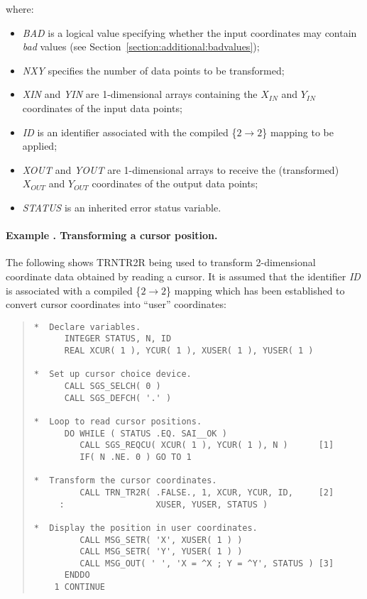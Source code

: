 \documentclass[twoside,11pt]{article}
\renewcommand{\_}{\texttt{\symbol{95}}}
\newcommand{\name}[1]{\mbox{\small{#1}}}
\newcommand{\fortvar}[1]{\mbox{\emph{#1}}}
\newcounter{examplecounter}
\newcommand{\example}[1]{\addtocounter{examplecounter}{1}
                         \paragraph{\textbf{Example \theexamplecounter. #1}}}
\begin{document}
where:

\begin{itemize}

\item \fortvar{BAD} is a logical value specifying whether the input
coordinates may contain \emph{bad} values (see
Section~\ref{section:additional:badvalues});

\item \fortvar{NXY} specifies the number of data points to be transformed;

\item \fortvar{XIN} and \fortvar{YIN} are 1-dimensional arrays containing
the $X_{IN}$ and $Y_{IN}$ coordinates of the input data points;

\item \fortvar{ID} is an identifier associated with the compiled
\mbox{\{$2 \rightarrow 2$\}} mapping to be applied;

\item \fortvar{XOUT} and \fortvar{YOUT} are 1-dimensional arrays to receive
the (transformed) $X_{OUT}$ and $Y_{OUT}$ coordinates of the output data
points;

\item \fortvar{STATUS} is an inherited error status variable.

\end{itemize}

\example{Transforming a cursor position.}
The following shows \name{TRN\_TR2R} being used to transform 2-dimensional
coordinate data obtained by reading a cursor.
It is assumed that the identifier \fortvar{ID} is associated with a compiled
\mbox{\{$2 \rightarrow 2$\}} mapping which has been established to convert
cursor coordinates into ``user'' coordinates:

\begin{quote}
\begin{verbatim}
*  Declare variables.
      INTEGER STATUS, N, ID
      REAL XCUR( 1 ), YCUR( 1 ), XUSER( 1 ), YUSER( 1 )

*  Set up cursor choice device.
      CALL SGS_SELCH( 0 )
      CALL SGS_DEFCH( '.' )

*  Loop to read cursor positions.
      DO WHILE ( STATUS .EQ. SAI__OK )
         CALL SGS_REQCU( XCUR( 1 ), YCUR( 1 ), N )      [1]
         IF( N .NE. 0 ) GO TO 1

*  Transform the cursor coordinates.
         CALL TRN_TR2R( .FALSE., 1, XCUR, YCUR, ID,     [2]
     :                  XUSER, YUSER, STATUS )

*  Display the position in user coordinates.
         CALL MSG_SETR( 'X', XUSER( 1 ) )
         CALL MSG_SETR( 'Y', YUSER( 1 ) )
         CALL MSG_OUT( ' ', 'X = ^X ; Y = ^Y', STATUS ) [3]
      ENDDO
    1 CONTINUE

\end{verbatim}
\end{quote}
\end{document}
